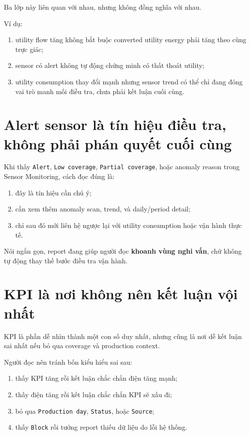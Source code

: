 Ba lớp này liên quan với nhau, nhưng không đồng nghĩa với nhau.

Ví dụ:

\begin{enumerate}[label=-]
\item utility flow tăng không bắt buộc converted utility energy phải tăng theo cùng trực giác;
\item sensor có alert không tự động chứng minh có thất thoát utility;
\item utility consumption thay đổi mạnh nhưng sensor trend có thể chỉ đang đóng vai trò manh mối điều tra, chưa phải kết luận cuối cùng.
\end{enumerate}

\section{Alert sensor là tín hiệu điều tra, không phải phán quyết cuối cùng}

Khi thấy \texttt{Alert}, \texttt{Low coverage}, \texttt{Partial coverage}, hoặc anomaly reason trong Sensor Monitoring, cách đọc đúng là:

\begin{enumerate}[label=-]
\item đây là tín hiệu cần chú ý;
\item cần xem thêm anomaly scan, trend, và daily/period detail;
\item chỉ sau đó mới liên hệ ngược lại với utility consumption hoặc vận hành thực tế.
\end{enumerate}

Nói ngắn gọn, report đang giúp người đọc \textbf{khoanh vùng nghi vấn}, chứ không tự động thay thế bước điều tra vận hành.

\section{KPI là nơi không nên kết luận vội nhất}

KPI là phần dễ nhìn thành một con số duy nhất, nhưng cũng là nơi dễ kết luận sai nhất nếu bỏ qua coverage và production context.

Người đọc nên tránh bốn kiểu hiểu sai sau:

\begin{enumerate}[label=-]
\item thấy KPI tăng rồi kết luận chắc chắn điện tăng mạnh;
\item thấy điện tăng rồi kết luận chắc chắn KPI sẽ xấu đi;
\item bỏ qua \texttt{Production day}, \texttt{Status}, hoặc \texttt{Source};
\item thấy \texttt{Block} rồi tưởng report thiếu dữ liệu do lỗi hệ thống.
\end{enumerate}

